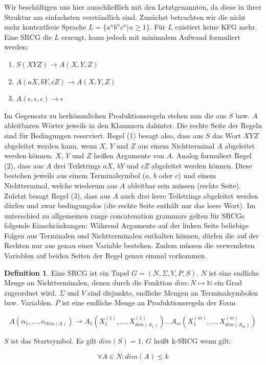 \documentclass[12pt,a4paper]{article}
\theoremstyle{definition}
\begin{document}
		Wir beschäftigen uns hier ausschließlich mit den Letztgenannten, da diese in ihrer Struktur am einfachsten verständlich sind. Zunächst betrachten wir die nicht mehr kontextfreie Sprache $L=\{a^nb^nc^n | n \geq 1\}$. Für $L$ existiert keine KFG mehr. Eine SRCG die $L$ erzeugt, kann jedoch mit minimalem Aufwand formuliert werden:
		
			\begin{enumerate}[label={(\arabic*)}]
				\item{$S(XYZ) \rightarrow A(X, Y, Z)$}
				\item{$A(aX, bY, cZ) \rightarrow A(X, Y, Z)$}
				\item{$A(\epsilon, \epsilon, \epsilon) \rightarrow \epsilon$}
			\end{enumerate}
		
		Im Gegensatz zu herkömmlichen Produktionsregeln stehen nun die aus $S$ bzw. $A$ ableitbaren Wörter jeweils in den Klammern dahinter.  Die rechte Seite der Regeln sind für Bedingungen reserviert. Regel (1) besagt also, dass aus $S$ das Wort $XYZ$ abgeleitet werden kann, wenn $X$, $Y$ und $Z$ aus einem Nichtterminal $A$ abgeleitet werden können. $X$, $Y$ und $Z$ heißen Argumente von $A$. Analog formuliert Regel (2), dass aus $A$ drei Teilstrings $aX$, $bY$ und $cZ$ abgeleitet werden können. Diese bestehen jeweils aus einem Terminalsymbol ($a$, $b$ oder $c$) und einem Nichtterminal, welche wiederum aus $A$ ableitbar sein müssen (rechte Seite). Zuletzt besagt Regel (3), dass aus $A$ auch drei leere Teilstrings abgeleitet werden dürfen und zwar bedingungslos (die rechte Seite enthält nur das leere Wort). Im unterschied zu allgemeinen range concatenation grammars gelten für SRCGs folgende Einschränkungen: Während Argumente auf der linken Seite beliebige Folgen aus Terminalen und Nichtterminalen enthalten können, dürfen die auf der Rechten nur aus genau einer Variable bestehen. Zudem müssen die verwendeten Variablen auf beiden Seiten der Regel genau einmal vorkommen.

			\newtheorem{srcg}{Definition}[subsection]
			\begin{srcg}
			Eine SRCG ist ein Tupel $G=(N, \Sigma, V, P, S)$. $N$ ist eine endliche Menge an Nichtterminalen, denen durch die Funktion $dim: N \mapsto \mathbb{N}$ ein Grad zugeordnet wird. $\Sigma$ und $V$ sind disjunkte, endliche Mengen an Terminalsymbolen bzw. Variablen. $P$ ist eine endliche Menge an Produktionsregeln der Form
	
				$$A(\alpha_1, \dots, \alpha_{dim(A)}) \rightarrow A_1(X_1^{(1)}, \dots, X_{dim(A_1)}^{(1)}) \dots A_m(X_1^{(m)}, \dots, X_{dim(A_m)}^{(m)})$$
	
			$S$ ist das Startsymbol. Es gilt $dim(S) = 1$. $G$ heißt k-SRCG wenn gilt:
				
				$$\forall A \in N: dim(A) \leq k$$
			\end{srcg}
		
\end{document}

